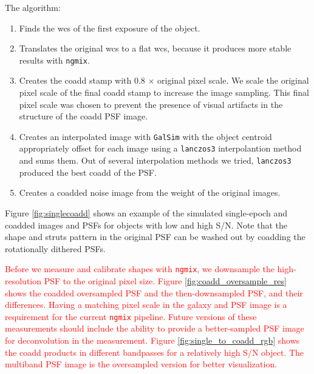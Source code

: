\documentclass[fleqn,usenatbib]{mnras}
\begin{document}
The algorithm: 
\begin{enumerate}
    \setlength\itemsep{1em}
    \item Finds the wcs of the first exposure of the object.
    \item Translates the original wcs to a flat wcs, because it produces more stable results with \texttt{ngmix}.
    \item Creates the coadd stamp with 0.8 $\times$ original pixel scale. We scale the original pixel scale of the final coadd stamp to increase the image sampling. This final pixel scale was chosen to prevent the presence of visual artifacts in the structure of the coadd PSF image. 
    \item Creates an interpolated image with \texttt{GalSim} with the object centroid appropriately offset for each image using a \texttt{lanczos3} interpolantion method and sums them. Out of several interpolation methods we tried, \texttt{lanczos3} produced the best coadd of the PSF.
    \item Creates a coadded noise image from the weight of the original images. 
\end{enumerate}
Figure \ref{fig:singlecoadd} shows an example of the simulated single-epoch and coadded images and PSFs for objects with low and high S/N. Note that the shape and struts pattern in the original PSF can be washed out by coadding the rotationally dithered PSFs. 


\textcolor{red}{Before we measure and calibrate shapes with \texttt{ngmix}, we downsample the high-resolution PSF to the original pixel size. Figure \ref{fig:coadd_oversample_res} shows the coadded oversampled PSF and the then-downsampled PSF, and their differences. Having a matching pixel scale in the galaxy and PSF image is a requirement for the current \texttt{ngmix} pipeline. Future versions of these measurements should include the ability to provide a better-sampled PSF image for deconvolution in the measurement. Figure \ref{fig:single_to_coadd_rgb} shows the coadd products in different bandpasses for a relatively high S/N object. The multiband PSF image is the oversampled version for better visualization.}


\end{document}
